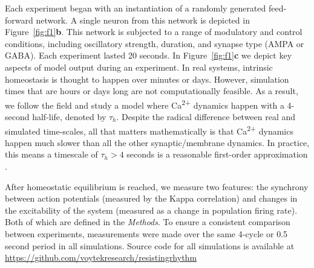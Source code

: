 \documentclass{article}
\begin{document}
Each experiment began with an instantiation of a randomly generated feed-forward network. A single neuron from this network is depicted in Figure~\ref{fig:f1}\textbf{b}. This network is subjected to a range of modulatory and control conditions, including oscillatory strength, duration, and synapse type (AMPA or GABA). Each experiment lasted 20 seconds. In Figure~\ref{fig:f1}\textbf{c} we depict key aspects of model output during an experiment. 
In real systems, intrinsic homeostasis is thought to happen over minutes or days. However, simulation times that are hours or days long are not computationally feasible. As a result, we follow the field and study a model where Ca\textsuperscript{2+} dynamics happen with a 4-second half-life, denoted by $\tau_h$. Despite the radical difference between real and simulated time-scales, all that matters mathematically is that Ca\textsuperscript{2+} dynamics happen much slower than all the other synaptic/membrane dynamics. In practice, this means a timescale of $\tau_h > 4$ seconds is a reasonable first-order approximation \cite{Golowasch1999,Marder2014,Marder2015,Gutierrez2013,Marder2014,OLeary2014,LeMasson1993,Abbott1993}.

After homeostatic equilibrium is reached, we measure two features: the synchrony between action potentials (measured by the Kappa correlation) and changes in the excitability of the system (measured as a change in population firing rate). Both of which are defined in the \textit{Methods}. To ensure a consistent comparison between experiments, measurements were made over the same 4-cycle or 0.5 second period in all simulations. Source code for all simulations is available at \url{https://github.com/voytekresearch/resistingrhythm}

\end{document}
